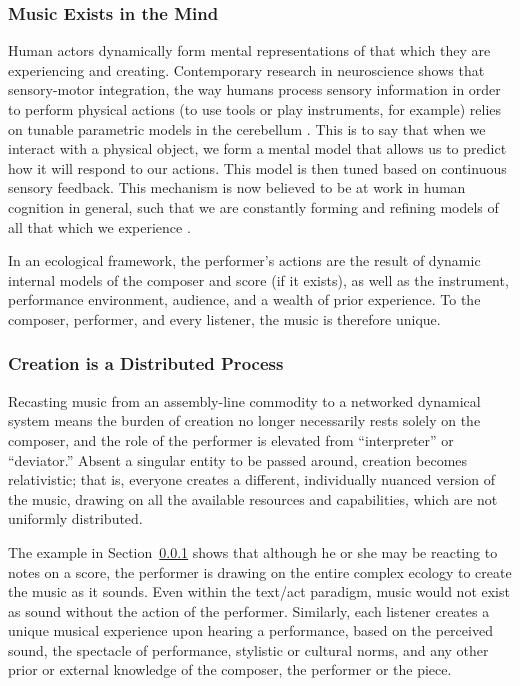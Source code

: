 \subsubsection{Music Exists in the Mind}
\label{Gurevich:subsub:4_1_1}
Human actors dynamically form mental representations of that which they are experiencing and creating. Contemporary research in neuroscience shows that sensory-motor integration, the way humans process sensory information in order to perform physical actions (to use tools or play instruments, for example) relies on tunable parametric models in the cerebellum \cite{Huang:2007,Wolpert:1998}. This is to say that when we interact with a physical object, we form a mental model that allows us to predict how it will respond to our actions. This model is then tuned based on continuous sensory feedback. This mechanism is now believed to be at work in human cognition in general, such that we are constantly forming and refining models of all that which we experience \cite{Kawato:1997,Wolpert:1998}.

In an ecological framework, the performer's actions are the result of dynamic internal models of the composer and score (if it exists), as well as the instrument, performance environment, audience, and a wealth of prior experience. To the composer, performer, and every listener, the music is therefore unique.

\subsubsection{Creation is a Distributed Process}
\label{Gurevich:subsub:4_1_2}
Recasting music from an assembly-line commodity to a networked dynamical system means the burden of creation no longer necessarily rests solely on the composer, and the role of the performer is elevated from ``interpreter'' or ``deviator.'' Absent a singular entity to be passed around, creation becomes relativistic; that is, everyone creates a different, individually nuanced version of the music, drawing on all the available resources and capabilities, which are not uniformly distributed.

The example in Section~\ref{Gurevich:subsub:4_1_1} shows that although he or she may be reacting to notes on a score, the performer is drawing on the entire complex ecology to create the music as it sounds. Even within the text/act paradigm, music would not exist as sound without the action of the performer. Similarly, each listener creates a unique musical experience upon hearing a performance, based on the perceived sound, the spectacle of performance, stylistic or cultural norms, and any other prior or external knowledge of the composer, the performer or the piece.

